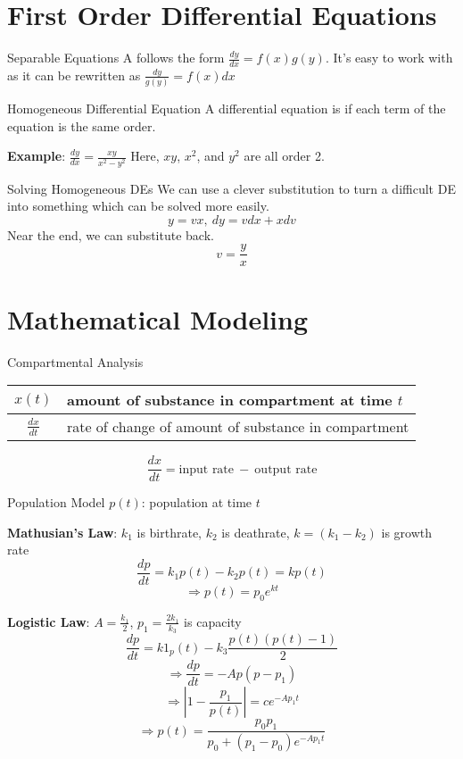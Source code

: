 \documentclass[12pt]{report}
\begin{document}
\chapter{First Order Differential Equations}
\begin{dfnbox}{Separable Equations}
	A  follows the form $\frac{dy}{dx} = f(x)g(y)$. It's easy to work with as it can be rewritten as $\frac{dy}{g(y)} = f(x)dx$
\end{dfnbox}

\begin{dfnbox}{Homogeneous Differential Equation}
	A differential equation is  if each term of the equation is the same order.
	
	\textbf{Example}: $\frac{dy}{dx} = \frac{xy}{x^2-y^2}$ Here, $xy$, $x^2$, and $y^2$ are all order 2.
\end{dfnbox}

\begin{thmbox}{Solving Homogeneous DEs}
	We can use a clever substitution to turn a difficult DE into something which can be solved more easily.
	$$y=vx,\ dy=vdx+xdv$$
	Near the end, we can substitute back.
	$$v=\frac{y}{x}$$
\end{thmbox}

\newpage
\chapter{Mathematical Modeling}
\begin{genbox}{Compartmental Analysis}
	\begin{tabular}{|c|l|} \hline
		$x(t)$ & amount of substance in compartment at time $t$ \\ \hline
		$\frac{dx}{dt}$ & rate of change of amount of substance in compartment \\ \hline
	\end{tabular}
	$$\frac{dx}{dt} = \text{input rate}\ -\ \text{output rate}$$
\end{genbox}

\begin{genbox}{Population Model}
	$p(t)$: population at time $t$
	
	\textbf{Mathusian's Law}: $k_1$ is birthrate, $k_2$ is deathrate, $k=(k_1-k_2)$ is growth rate
	$$\frac{dp}{dt} = k_1p(t)-k_2p(t)=kp(t)$$
	$$\Rightarrow p(t)=p_0e^{kt}$$
	
	\textbf{Logistic Law}: $A = \frac{k_1}{2}$, $p_1=\frac{2k_1}{k_3}$ is capacity
	$$\frac{dp}{dt} = k1_p(t) - k_3\frac{p(t)(p(t)-1)}{2}$$
	$$\Rightarrow \frac{dp}{dt} = -Ap(p-p_1)$$
	$$\Rightarrow \left| 1 - \frac{p_1}{p(t)} \right| = ce^{-Ap_1t}$$
	$$\Rightarrow p(t) = \frac{p_0p_1}{p_0 + (p_1 - p_0)e^{-Ap_1t}}$$
\end{genbox}
\end{document}
